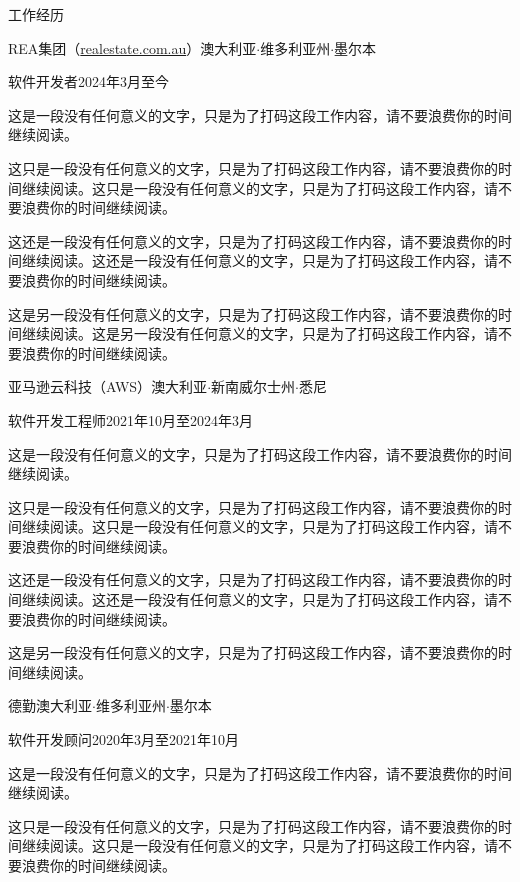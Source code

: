 \documentclass{xsha}
\begin{document}
\begin{xsection}{工作经历}

\begin{xheading}{REA集团（\href{https://realestate.com.au/}{realestate.com.au}）}{澳大利亚$\cdot$维多利亚州$\cdot$墨尔本}
\begin{xsubheading}{软件开发者}{2024年3月至今}
\item 这是一段没有任何意义的文字，只是为了打码这段工作内容，请不要浪费你的时间继续阅读。
\item 这只是一段没有任何意义的文字，只是为了打码这段工作内容，请不要浪费你的时间继续阅读。这只是一段没有任何意义的文字，只是为了打码这段工作内容，请不要浪费你的时间继续阅读。
\item 这还是一段没有任何意义的文字，只是为了打码这段工作内容，请不要浪费你的时间继续阅读。这还是一段没有任何意义的文字，只是为了打码这段工作内容，请不要浪费你的时间继续阅读。
\item 这是另一段没有任何意义的文字，只是为了打码这段工作内容，请不要浪费你的时间继续阅读。这是另一段没有任何意义的文字，只是为了打码这段工作内容，请不要浪费你的时间继续阅读。
\end{xsubheading}
\end{xheading}

\begin{xheading}{亚马逊云科技（AWS）}{澳大利亚$\cdot$新南威尔士州$\cdot$悉尼}
\begin{xsubheading}{软件开发工程师}{2021年10月至2024年3月}
\item 这是一段没有任何意义的文字，只是为了打码这段工作内容，请不要浪费你的时间继续阅读。
\item 这只是一段没有任何意义的文字，只是为了打码这段工作内容，请不要浪费你的时间继续阅读。这只是一段没有任何意义的文字，只是为了打码这段工作内容，请不要浪费你的时间继续阅读。
\item 这还是一段没有任何意义的文字，只是为了打码这段工作内容，请不要浪费你的时间继续阅读。这还是一段没有任何意义的文字，只是为了打码这段工作内容，请不要浪费你的时间继续阅读。
\item 这是另一段没有任何意义的文字，只是为了打码这段工作内容，请不要浪费你的时间继续阅读。
\end{xsubheading}
\end{xheading}

\begin{xheading}{德勤}{澳大利亚$\cdot$维多利亚州$\cdot$墨尔本}
\begin{xsubheading}{软件开发顾问}{2020年3月至2021年10月}
\item 这是一段没有任何意义的文字，只是为了打码这段工作内容，请不要浪费你的时间继续阅读。
\item 这只是一段没有任何意义的文字，只是为了打码这段工作内容，请不要浪费你的时间继续阅读。这只是一段没有任何意义的文字，只是为了打码这段工作内容，请不要浪费你的时间继续阅读。
\end{xsubheading}
\end{xheading}


\end{xsection}
\end{document}
